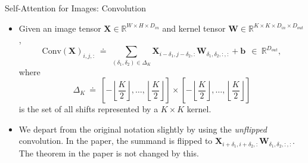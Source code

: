 \documentclass[9pt]{beamer}
\newcommand{\bb}{\mathbb}
\newcommand{\mb}{\bm}
\begin{document}
\newcommand{\sqbrkt}[1]{\left[#1\right]}
\newcommand{\ktwo}{\left\lfloor\frac K2\right\rfloor}
\begin{frame}{Self-Attention for Images: Convolution}
\begin{itemize}
\item Given an image tensor $\bm X \in \bb R^{W\times H\times D_{in}}$ and kernel tensor $\bm W \in \bb R^{K\times K \times D_{in} \times D_{out}}$,
\begin{equation}
\text{Conv}(\mb X)_{i,j,:} \ \doteq \ \sum_{(\delta_1, \delta_2) \in \Delta_K} \mb X_{i-\delta_1, j-\delta_2, :} \mb W_{\delta_1, \delta_2, :, :} + \mb b \ \ \in \ \mathbb R^{D_{out}},
\end{equation}
where
$$\Delta_K \ \doteq \ \sqbrkt{-\ktwo, \dots, \ktwo} \times \sqbrkt{-\ktwo, \dots, \ktwo}$$
is the set of all shifts represented by a $K\times K$ kernel.

\vspace{.1in}
\item We depart from the original notation slightly by using the {\em unflipped} convolution. In the paper, the summand is flipped to $\bm X_{i+\delta_1, i+\delta_2,:} \bm W_{\delta_1, \delta_2,:,:}$. The theorem in the paper is not changed by this.
\end{itemize}
\end{frame}
\end{document}
